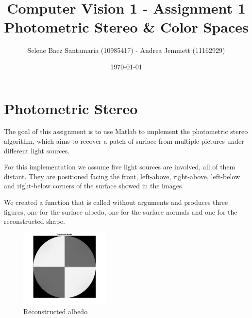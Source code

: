 \documentclass[11pt]{article}
\title{
	{Computer Vision 1 - Assignment 1 \\
	Photometric Stereo \& Color Spaces}
}
\author{
Selene Baez Santamaria (10985417) - Andrea Jemmett (11162929)}
\date{\today}
\begin{document}
\maketitle


\section{Photometric Stereo}
The goal of this assignment is to use Matlab to implement the photometric stereo algorithm, which aims to recover a patch of surface from multiple pictures under different light sources.

For this implementation we assume five light sources are involved, all of them distant.
They are positioned facing the front, left-above, right-above, left-below and right-below corners of the surface showed in the images.

We created a function that is called without arguments and produces three figures, one for the surface albedo, one for the surface normals and one for the reconstructed shape.

\begin{figure}[!htp]
    \centering
    \includegraphics[width=0.4\textwidth]{albedo.jpg}
    \caption{Reconstructed albedo}
    \label{fig:albedo}
\end{figure}
\end{document}
